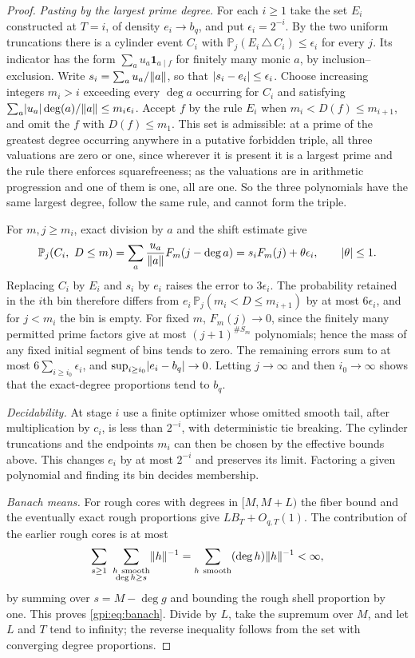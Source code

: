 \begin{proof}
\emph{Pasting by the largest prime degree.} For each $i\ge1$ take the set $E_i$ constructed
at $T=i$, of density $e_i\to b_q$, and put $\epsilon_i=2^{-i}$. By the two uniform
truncations there is a cylinder event $C_i$ with $\mathbb P_j(E_i\,\triangle\,C_i)\le\epsilon_i$
for every $j$. Its indicator has the form $\sum_au_a\mathbf 1_{a\mid f}$ for finitely many
monic $a$, by inclusion--exclusion. Write $s_i=\sum_au_a/\lVert a\rVert$, so that
$\lvert s_i-e_i\rvert\le\epsilon_i$. Choose increasing integers $m_i>i$ exceeding every $\deg a$
occurring for $C_i$ and satisfying $\sum_a\lvert u_a\rvert\deg(a)/\lVert a\rVert\le m_i\epsilon_i$. Accept
$f$ by the rule $E_i$ when $m_i<D(f)\le m_{i+1}$, and omit the $f$ with $D(f)\le m_1$. This
set is admissible: at a prime of the greatest degree occurring anywhere in a putative
forbidden triple, all three valuations are zero or one, since wherever it is present it is a
largest prime and the rule there enforces squarefreeness; as the valuations are in arithmetic
progression and one of them is one, all are one. So the three polynomials have the same
largest degree, follow the same rule, and cannot form the triple.

For $m,j\ge m_i$, exact division by $a$ and the shift estimate give
\[
 \mathbb P_j(C_i,\ D\le m)=\sum_a\frac{u_a}{\lVert a\rVert}F_m(j-\deg a)=s_iF_m(j)+\theta\epsilon_i,
 \qquad\lvert\theta\rvert\le1 .
\]
Replacing $C_i$ by $E_i$ and $s_i$ by $e_i$ raises the error to $3\epsilon_i$. The
probability retained in the $i$th bin therefore differs from
$e_i\,\mathbb P_j(m_i<D\le m_{i+1})$ by at most $6\epsilon_i$, and for $j<m_i$ the bin is
empty. For fixed $m$, $F_m(j)\to0$, since the finitely many permitted prime factors give at
most $(j+1)^{\#S_m}$ polynomials; hence the mass of any fixed initial segment of bins tends
to zero. The remaining errors sum to at most $6\sum_{i\ge i_0}\epsilon_i$, and
$\sup_{i\ge i_0}\lvert e_i-b_q\rvert\to0$. Letting $j\to\infty$ and then $i_0\to\infty$ shows that the
exact-degree proportions tend to $b_q$.

\emph{Decidability.} At stage $i$ use a finite optimizer whose omitted smooth tail, after
multiplication by $c_i$, is less than $2^{-i}$, with deterministic tie breaking. The cylinder
truncations and the endpoints $m_i$ can then be chosen by the effective bounds above. This
changes $e_i$ by at most $2^{-i}$ and preserves its limit. Factoring a given polynomial and
finding its bin decides membership.

\emph{Banach means.} For rough cores with degrees in $[M,M+L)$ the fiber bound and the
eventually exact rough proportions give $LB_T+O_{q,T}(1)$. The contribution of the earlier
rough cores is at most
\[
 \sum_{s\ge1}\ \sum_{\substack{h\ \mathrm{smooth}\\ \deg h\ge s}}\norm h^{-1}
 =\sum_{h\ \mathrm{smooth}}(\deg h)\norm h^{-1}<\infty ,
\]
by summing over $s=M-\deg g$ and bounding the rough shell proportion by one. This proves
\eqref{gpi:eq:banach}. Divide by $L$, take the supremum over $M$, and let $L$ and $T$ tend to
infinity; the reverse inequality follows from the set with converging degree proportions.


\end{proof}
